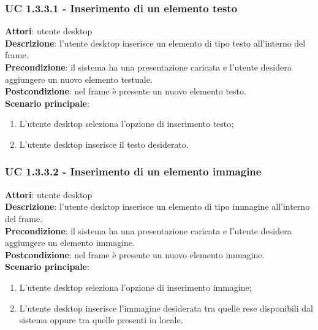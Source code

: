 \subsubsection{UC 1.3.3.1 - Inserimento di un elemento testo}{
	\label{uc1.3.3.1}
	\textbf{Attori}: utente desktop \\
	\textbf{Descrizione}: l'utente desktop inserisce un elemento di tipo testo all'interno del frame. \\
	\textbf{Precondizione}: il sistema ha una presentazione caricata e l'utente desidera aggiungere un nuovo elemento testuale.	\\
	\textbf{Postcondizione}: nel frame è presente un nuovo elemento testo.	\\
	\textbf{Scenario principale}:
	\begin{enumerate}
		\item L'utente desktop seleziona l'opzione di inserimento testo;
		\item L'utente desktop inserisce il testo desiderato.
	\end{enumerate}
	}
\subsubsection{UC 1.3.3.2 - Inserimento di un elemento immagine}{
	\label{uc1.3.3.2}
	\textbf{Attori}: utente desktop \\
	\textbf{Descrizione}: l'utente desktop inserisce un elemento di tipo immagine all'interno del frame. \\
	\textbf{Precondizione}: il sistema ha una presentazione caricata e l'utente desidera aggiungere un elemento immagine.	\\
	\textbf{Postcondizione}: nel frame è presente un nuovo elemento immagine.	\\
	\textbf{Scenario principale}:
	\begin{enumerate}
		\item L'utente desktop seleziona l'opzione di inserimento immagine;
		\item L'utente desktop inserisce l'immagine desiderata tra quelle rese disponibili dal sistema oppure tra quelle presenti in locale.
	\end{enumerate}
	}
